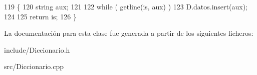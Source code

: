 \begin{DoxyCode}
119                                                    \{
120     \textcolor{keywordtype}{string} aux;
121 
122     \textcolor{keywordflow}{while} ( getline(is, aux) )
123         D.datos.insert(aux);
124 
125     \textcolor{keywordflow}{return} is;
126 \}
\end{DoxyCode}


La documentación para esta clase fue generada a partir de los siguientes ficheros\+:\begin{DoxyCompactItemize}
\item 
include/Diccionario.\+h\item 
src/Diccionario.\+cpp\end{DoxyCompactItemize}
